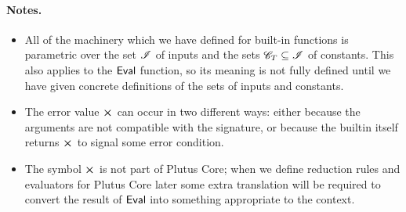 \paragraph{Notes.}
\begin{itemize}
  \item All of the machinery which we have defined for built-in functions is
    parametric over the set $\mathscr{I}$ of inputs and the sets $\mathscr{C}_{T} \subseteq
    \mathscr{I}$ of constants. This also applies to the $\mathsf{Eval}$ function, so its
    meaning is not fully defined until we have given concrete definitions of the
    sets of inputs and constants.
  \item The error value $\errorX$ can occur in two different ways: either
    because the arguments are not compatible with the signature, or because the
    builtin itself returns $\errorX$ to signal some error condition.
\item The symbol $\errorX$ is not part of Plutus Core; when we define reduction
  rules and evaluators for Plutus Core later some extra translation will be
  required to convert the result of $\mathsf{Eval}$ into something appropriate to the
  context.
\end{itemize}


